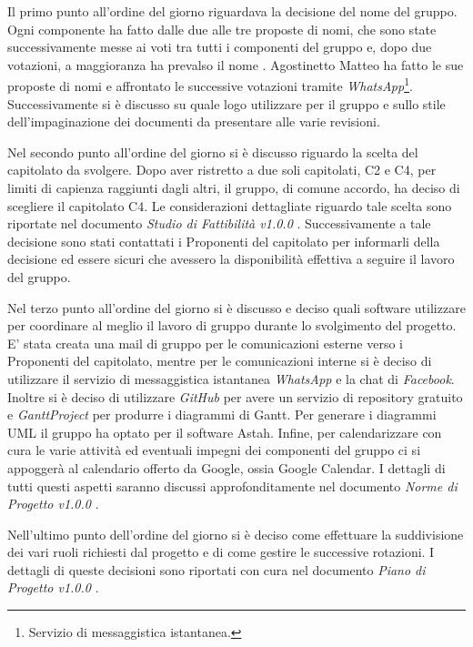 Il primo punto all'ordine del giorno riguardava la decisione del nome del gruppo. Ogni componente ha fatto dalle due alle tre proposte di nomi, che sono state successivamente messe ai voti tra tutti i componenti del gruppo e, dopo due votazioni, a maggioranza ha prevalso il nome \GRUPPO. Agostinetto Matteo ha fatto le sue proposte di nomi e affrontato le successive votazioni tramite \textit{WhatsApp}\footnote{Servizio di messaggistica istantanea.}. Successivamente si è discusso su quale logo utilizzare per il gruppo e sullo stile dell'impaginazione dei documenti da presentare alle varie revisioni.

\noindent Nel secondo punto all'ordine del giorno si è discusso riguardo la scelta del capitolato da svolgere. Dopo aver ristretto a due soli capitolati, C2 e C4, per limiti di capienza raggiunti dagli altri, il gruppo, di comune accordo, ha deciso di scegliere il capitolato C4. Le considerazioni dettagliate riguardo tale scelta sono riportate nel documento \textit{Studio di Fattibilità v1.0.0} . Successivamente a tale decisione sono stati contattati i Proponenti del capitolato per informarli della decisione ed essere sicuri che avessero la disponibilità effettiva a seguire il lavoro del gruppo.

\noindent Nel terzo punto all'ordine del giorno si è discusso e deciso quali software utilizzare per coordinare al meglio il lavoro di gruppo durante lo svolgimento del progetto. E' stata creata una mail di gruppo per le comunicazioni esterne verso i Proponenti del capitolato, mentre per le comunicazioni interne si è deciso di utilizzare il servizio di messaggistica istantanea \textit{WhatsApp} e la chat di \textit{\gls{Facebook}}. Inoltre si è deciso di utilizzare \textit{\gls{GitHub}} per avere un servizio di \gls{repository} gratuito e \textit{GanttProject} per produrre i diagrammi di \gls{Gantt}. Per generare i diagrammi \gls{UML} il gruppo ha optato per il software \gls{Astah}. Infine, per calendarizzare con cura le varie attività ed eventuali impegni dei componenti del gruppo ci si appoggerà al calendario offerto da Google, ossia \gls{Google Calendar}. I dettagli di tutti questi aspetti saranno discussi approfonditamente nel documento \textit{Norme di Progetto v1.0.0} .

\noindent Nell'ultimo punto dell'ordine del giorno si è deciso come effettuare la suddivisione dei vari ruoli richiesti dal progetto e di come gestire le successive rotazioni. I dettagli di queste decisioni sono riportati con cura nel documento \textit{Piano di Progetto v1.0.0} .

